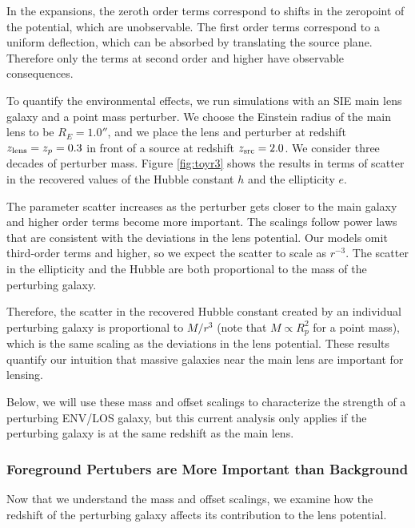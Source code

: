 \documentclass{emulateapj}
\begin{document}
In the expansions, the zeroth order terms correspond to shifts in the zeropoint of the potential, which are unobservable.  The first order terms correspond to a uniform deflection, which can be absorbed by translating the source plane.  Therefore only the terms at second order and higher have observable consequences.

To quantify the environmental effects, we run simulations with an SIE main lens galaxy and a point mass perturber.  We choose the Einstein radius of the main lens to be $R_E = 1.0''$, and we place the lens and perturber at redshift $z_{\rm{lens}} = z_p = 0.3$ in front of a source at redshift $z_{\rm{src}} = 2.0$.  We consider three decades of perturber mass.  Figure \ref{fig:toyr3} shows the results in terms of scatter in the recovered values of the Hubble constant $h$ and the ellipticity $e$.

The parameter scatter increases as the perturber gets closer to the main galaxy and higher order terms become more important.  The scalings follow power laws that are consistent with the deviations in the lens potential. Our models omit third-order terms and higher, so we expect the scatter to scale as $r^{-3}$. The scatter in the ellipticity and the Hubble are both proportional to the mass of the perturbing galaxy. 

Therefore, the scatter in the recovered Hubble constant created by an individual perturbing galaxy is proportional to $M / r^3$ (note that $ M \propto R_p^2$ for a point mass), which is the same scaling as the deviations in the lens potential. These results quantify our intuition that massive galaxies near the main lens are important for lensing. 

Below, we will use these mass and offset scalings to characterize the strength of a perturbing ENV/LOS galaxy, but this current analysis only applies if the perturbing galaxy is at the same redshift as the main lens.

\subsubsection{Foreground Pertubers are More Important than Background}
\label{sec:frontback}

Now that we understand the mass and offset scalings, we examine how the redshift of the perturbing galaxy affects its contribution to the lens potential. 
\end{document}
